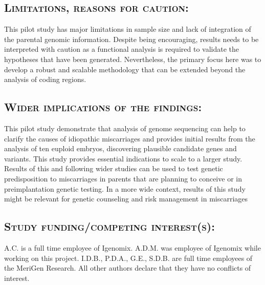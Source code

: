 \subsection*{\textsc{Limitations, reasons for caution:}} 
This pilot study has major limitations in sample size and lack of integration of the parental genomic information. Despite being encouraging, results needs to be interpreted with caution as a functional analysis is required to validate the hypotheses that have been generated. Nevertheless, the primary focus here was to develop a robust and scalable methodology that can be extended beyond the analysis of coding regions.   %

\subsection*{\textsc{Wider implications of the findings:}} 
This pilot study demonstrate that analysis of genome sequencing can help to clarify the causes of idiopathic miscarriages and provides initial results from the analysis of ten euploid embryos, discovering plausible candidate genes and variants. This study provides essential indications to scale to a larger study. Results of this and following wider studies can be used to test genetic predisposition to miscarriages in parents that are planning to conceive or in preimplantation genetic testing. In a more wide context, results of this study might be relevant for genetic counseling and risk management in miscarriages

\subsection*{\textsc{Study funding/competing interest(s):}} %
A.C. is a full time employee of Igenomix. A.D.M. was employee of Igenomix while working on this project. I.D.B., P.D.A., G.E., S.D.B. are full time employees of the MeriGen Research. All other authors declare that they have no conflicts of interest.

